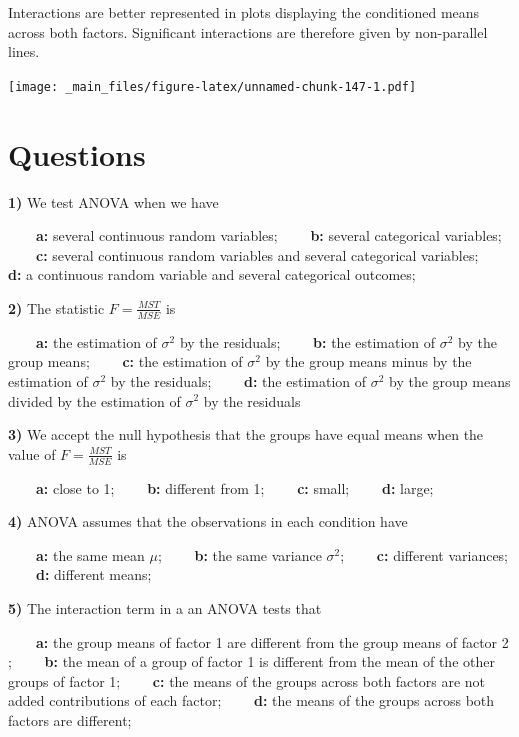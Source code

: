 \documentclass[
]{book}
\begin{document}
Interactions are better represented in plots displaying the conditioned means across both factors. Significant interactions are therefore given by non-parallel lines.

\texttt{[image: \_main\_files/figure-latex/unnamed-chunk-147-1.pdf]}

\hypertarget{questions-13}{%
\section{Questions}\label{questions-13}}

\textbf{1)} We test ANOVA when we have

\textbf{\(\qquad\)a:} several continuous random variables;
\textbf{\(\qquad\)b:} several categorical variables;
\textbf{\(\qquad\)c:} several continuous random variables and several categorical variables;
\textbf{\(\qquad\)d:} a continuous random variable and several categorical outcomes;

\textbf{2)} The statistic \(F=\frac{MST}{MSE}\) is

\textbf{\(\qquad\)a:} the estimation of \(\sigma^2\) by the residuals;
\textbf{\(\qquad\)b:} the estimation of \(\sigma^2\) by the group means;
\textbf{\(\qquad\)c:} the estimation of \(\sigma^2\) by the group means minus by the estimation of \(\sigma^2\) by the residuals;
\textbf{\(\qquad\)d:} the estimation of \(\sigma^2\) by the group means divided by the estimation of \(\sigma^2\) by the residuals

\textbf{3)} We accept the null hypothesis that the groups have equal means when the value of \(F=\frac{MST}{MSE}\) is

\textbf{\(\qquad\)a:} close to 1;
\textbf{\(\qquad\)b:} different from 1;
\textbf{\(\qquad\)c:} small;
\textbf{\(\qquad\)d:} large;

\textbf{4)} ANOVA assumes that the observations in each condition have

\textbf{\(\qquad\)a:} the same mean \(\mu\);
\textbf{\(\qquad\)b:} the same variance \(\sigma^2\);
\textbf{\(\qquad\)c:} different variances;
\textbf{\(\qquad\)d:} different means;

\textbf{5)} The interaction term in a an ANOVA tests that

\textbf{\(\qquad\)a:} the group means of factor 1 are different from the group means of factor 2 ;
\textbf{\(\qquad\)b:} the mean of a group of factor 1 is different from the mean of the other groups of factor 1;
\textbf{\(\qquad\)c:} the means of the groups across both factors are not added contributions of each factor;
\textbf{\(\qquad\)d:} the means of the groups across both factors are different;
\end{document}
